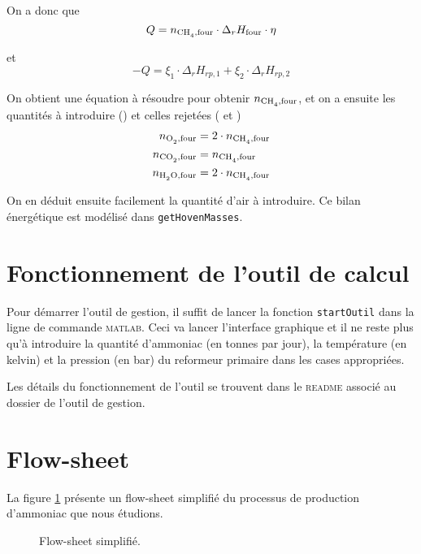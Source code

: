 On a donc que 
\[
	Q = n_{\ce{CH4},\text{four}} \cdot \Delta_r H_{\text{four}} \cdot \eta
\]

et 
\[
	-Q = \xi_1 \cdot \Delta_r H_{rp,1} + \xi_2 \cdot \Delta_r H_{rp,2}
\]

On obtient une équation à résoudre pour obtenir $n_{\ce{CH4},\text{four}}$, et on a ensuite
les quantités à introduire () et celles rejetées ( et )
\begin{align*}
	n_{\ce{O2},\text{four}} &= 2 \cdot n_{\ce{CH4},\text{four}} \\
	n_{\ce{CO2},\text{four}} &= n_{\ce{CH4},\text{four}} \\
	n_{\ce{H2O},\text{four}} &= 2 \cdot n_{\ce{CH4},\text{four}}
\end{align*}

On en déduit ensuite facilement la quantité d'air à introduire.
Ce bilan énergétique est modélisé dans \texttt{getHovenMasses}.



\section{Fonctionnement de l'outil de calcul}

Pour démarrer l'outil de gestion, il suffit de lancer la fonction \texttt{startOutil}
dans la ligne de commande \textsc{matlab}.
Ceci va lancer l'interface graphique et il ne reste plus qu'à introduire
la quantité d'ammoniac (en tonnes par jour), la température (en kelvin) et
la pression (en bar) du reformeur primaire dans les cases appropriées.

Les détails du fonctionnement de l'outil se trouvent
dans le \textsc{readme} associé au dossier de l'outil de gestion.

\section{Flow-sheet}
\label{sec:flowsheet}

La figure \ref{fig:flowsheet} présente un flow-sheet simplifié du processus 
de production d'ammoniac que nous étudions.

\begin{figure}
	\begin{center}
		
	\end{center}
	\caption{Flow-sheet simplifié.}
	\label{fig:flowsheet}
\end{figure}

